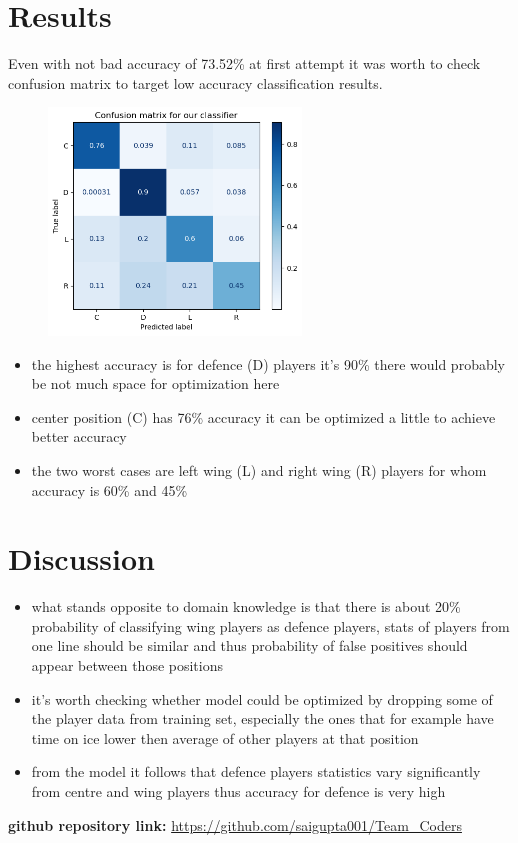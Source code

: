 \section{Results}
	Even with not bad accuracy of 73.52\% at first attempt it was worth to check confusion matrix to target low accuracy classification results.
	
	\begin{figure}[H]
        \includegraphics[width=0.6\textwidth]{matrix}
    \end{figure}
	
	\begin{itemize}
		\item the highest accuracy is for defence (D) players it's 90\% there would probably be not much space for optimization here
		\item center position (C) has 76\% accuracy it can be optimized a little to achieve better accuracy
		\item the two worst cases are left wing (L) and right wing (R) players for whom accuracy is 60\% and 45\%
	\end{itemize}
	
	\section{Discussion}
	\begin{itemize}
		\item what stands opposite to domain knowledge is that there is about 20\% probability of classifying wing players as defence players, stats of players from one line should be similar and thus probability of false positives should appear between those positions
		\item it's worth checking whether model could be optimized by dropping some of the player data from training set, especially the ones that for example have time on ice lower then average of other players at that position
		\item from the model it follows that defence players statistics vary significantly from centre and wing players thus accuracy for defence is very high
		
	\end{itemize}

	\textbf{github repository link:}
	\href{https://github.com/saigupta001/Team\_Coders}{https://github.com/saigupta001/Team\_Coders}
